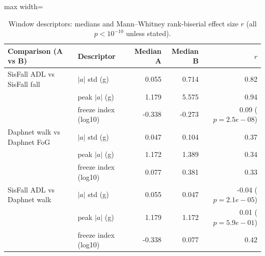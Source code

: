 \begin{table}[ht]
\centering
\small
\caption{Window descriptors: medians and Mann--Whitney rank-biserial effect size $r$ (all $p<10^{-10}$ unless stated).}
\label{tab:mannwhitney}
\begin{adjustbox}{max width=\textwidth}
\begin{tabular}{llrrr}
\toprule
Comparison (A vs B) & Descriptor & Median A & Median B & $r$ \\
\midrule
SisFall ADL vs SisFall fall & $|a|$ std (g) & 0.055 & 0.714 & 0.82 \\
 & peak $|a|$ (g) & 1.179 & 5.575 & 0.94 \\
 & freeze index (log10) & -0.338 & -0.273 & 0.09 ($p=2.5e-08$) \\
Daphnet walk vs Daphnet FoG & $|a|$ std (g) & 0.047 & 0.104 & 0.37 \\
 & peak $|a|$ (g) & 1.172 & 1.389 & 0.34 \\
 & freeze index (log10) & 0.077 & 0.381 & 0.33 \\
SisFall ADL vs Daphnet walk & $|a|$ std (g) & 0.055 & 0.047 & -0.04 ($p=2.1e-05$) \\
 & peak $|a|$ (g) & 1.179 & 1.172 & 0.01 ($p=5.9e-01$) \\
 & freeze index (log10) & -0.338 & 0.077 & 0.42 \\
\bottomrule
\end{tabular}
\end{adjustbox}
\end{table}